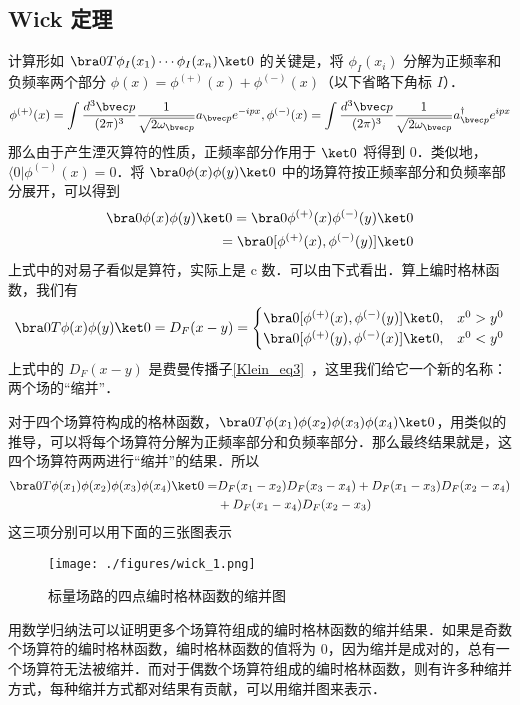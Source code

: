 \subsection{Wick 定理}
计算形如 $\bra 0 T\phi_I(x_1)\cdots\phi_I(x_n) \ket 0$ 的关键是，将 $\phi_I(x_i)$ 分解为正频率和负频率两个部分 $\phi( x)=\phi^{(+)}( x)+\phi^{(-)}( x)$（以下省略下角标 $I$）．
\begin{equation}
\phi^{(+)}( x) = \int \frac{d{}^3{\bvec p}}{(2\pi)^3} \frac{1}{\sqrt{2\omega_{\bvec p}}}a_{\bvec p} e^{-ipx} ,
\phi^{(-)}( x) = \int \frac{d{}^3{\bvec p}}{(2\pi)^3} \frac{1}{\sqrt{2\omega_{\bvec p}}}a_{\bvec p}^\dagger e^{ipx} 
\end{equation}
那么由于产生湮灭算符的性质，正频率部分作用于 $\ket 0$ 将得到 $0$．类似地，$\langle 0| \phi^{(-)}( x)=0$．将 $\bra 0 \phi(x)\phi(y)\ket 0$ 中的场算符按正频率部分和负频率部分展开，可以得到
\begin{equation}
\begin{aligned}
\bra 0 \phi( x)\phi( y)\ket 0=\bra 0 \phi^{(+)}( x)\phi^{(-)}( y)\ket 0\\
 = \bra 0[\phi^{(+)}( x),\phi^{(-)}( y)]\ket 0
\end{aligned}
\end{equation}
上式中的对易子看似是算符，实际上是 c 数．可以由下式看出．算上编时格林函数，我们有
\begin{equation}
\bra 0 T\phi( x)\phi( y)\ket 0=D_F(x-y)=\begin{cases}
\bra 0[\phi^{(+)}( x),\phi^{(-)}( y)]\ket 0, &x^0>y^0\\
\bra 0[\phi^{(+)}( y),\phi^{(-)}( x)]\ket 0, &x^0<y^0
\end{cases}
\end{equation}
上式中的 $D_F(x-y)$ 是费曼传播子\autoref{Klein_eq3}~，这里我们给它一个新的名称：两个场的“缩并”．

对于四个场算符构成的格林函数，$\bra 0 T\phi(x_1)\phi(x_2)\phi(x_3)\phi(x_4)\ket 0$，用类似的推导，可以将每个场算符分解为正频率部分和负频率部分．那么最终结果就是，这四个场算符两两进行“缩并”的结果．所以
\begin{equation}
\begin{aligned}
\bra 0 T\phi(x_1)\phi(x_2)\phi(x_3)\phi(x_4)\ket 0=&D_F(x_1-x_2)D_F(x_3-x_4)+D_F(x_1-x_3)D_F(x_2-x_4)
\\&+D_F(x_1-x_4)D_F(x_2-x_3)
\end{aligned}
\end{equation}
这三项分别可以用下面的三张图表示
\begin{figure}[ht]
\centering
\texttt{[image: ./figures/wick\_1.png]}
\caption{标量场路的四点编时格林函数的缩并图} \label{wick_fig1}
\end{figure}

用数学归纳法可以证明更多个场算符组成的编时格林函数的缩并结果．如果是奇数个场算符的编时格林函数，编时格林函数的值将为 $0$，因为缩并是成对的，总有一个场算符无法被缩并．而对于偶数个场算符组成的编时格林函数，则有许多种缩并方式，每种缩并方式都对结果有贡献，可以用缩并图来表示．